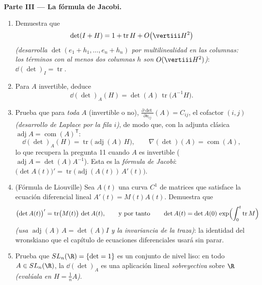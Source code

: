 \begin{problem}
\medskip
\noindent\textbf{Parte III --- La fórmula de Jacobi.}
\begin{enumerate}[resume]
  \item Demuestra que
        \[
        \det(I + H) = 1 + \operatorname{tr}H +
        O\bigl(\vertiii H^2\bigr)
        \]
        \emph{(desarrolla $\det(e_1 + h_1, \dots, e_n + h_n)$ por
        multilinealidad en las columnas: los términos con al menos
        dos columnas $h$ son $O(\vertiii H^2)$)}: $\dd(\det)_I =
        \operatorname{tr}$.
  \item Para $A$ invertible, deduce
        \[
        \dd(\det)_A(H) = \det(A)\,
        \operatorname{tr}\bigl(A^{-1}H\bigr) .
        \]
  \item Prueba que para \emph{toda} $A$ (invertible o no),
        $\frac{\partial\det}{\partial a_{ij}}(A) = C_{ij}$, el
        cofactor $(i,j)$ \emph{(desarrollo de Laplace por la fila
        $i$)}, de modo que, con la adjunta clásica
        $\operatorname{adj}A = \operatorname{com}(A)^{\mathsf T}$:
        \[
        \dd(\det)_A(H) =
        \operatorname{tr}\bigl(\operatorname{adj}(A)\,H\bigr),
        \qquad
        \nabla(\det)(A) = \operatorname{com}(A) ,
        \]
        lo que recupera la pregunta 11 cuando $A$ es invertible
        ($\operatorname{adj}A = \det(A)A^{-1}$). Esta es la
        \emph{fórmula de Jacobi}: $\bigl(\det A(t)\bigr)' =
        \operatorname{tr}\bigl( \operatorname{adj}(A(t))\,A'(t)\bigr)$.
  \item (Fórmula de Liouville) Sea $A(t)$ una curva $C^1$ de
        matrices que satisface la ecuación diferencial lineal $A'(t)
        = M(t)A(t)$. Demuestra que
        \[
        \bigl(\det A(t)\bigr)' =
        \operatorname{tr}\bigl(M(t)\bigr)\,\det A(t),
        \qquad\text{y por tanto}\qquad
        \det A(t) = \det A(0)\,
        \exp\Bigl(\int_0^t\operatorname{tr}M\Bigr)
        \]
        \emph{(usa $\operatorname{adj}(A)\,A = \det(A)I$ y la
        invariancia  de la traza)}: la identidad del
        wronskiano que el capítulo de ecuaciones diferenciales usará
        sin parar.
  \item Prueba que $SL_n(\R) = \{\det = 1\}$ es un conjunto de nivel
        liso: en todo $A \in SL_n(\R)$, la  $\dd(\det)_A$
        es una aplicación lineal \emph{sobreyectiva} sobre $\R$
        \emph{(evalúala en $H = \frac1nA$)}.
\end{enumerate}


\end{problem}
